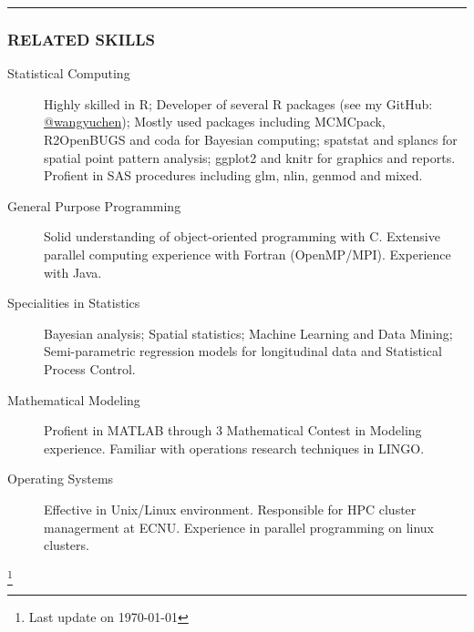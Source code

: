 \documentclass[11pt]{article}
\newcommand{\CPP}
{C\nolinebreak[4]\hspace{-.05em}\raisebox{.22ex}{\footnotesize\bf ++}}
\begin{document}
	\vspace{0.2em}
	\hrule

	\subsubsection*{\centering RELATED SKILLS}
	\vspace{-.3em}

	\begin{description}
		\item[Statistical Computing] Highly skilled in R; Developer of several R packages (see my GitHub: \href{https://www.github.com/wangyuchen}{@wangyuchen}); Mostly used packages including MCMCpack, R2OpenBUGS and coda for Bayesian computing; spatstat and splancs for spatial point pattern analysis; ggplot2 and knitr for graphics and reports. Profient in SAS procedures including glm, nlin, genmod and mixed.
		\item[General Purpose Programming] Solid understanding of object-oriented programming with \CPP. Extensive parallel computing experience with Fortran (OpenMP/MPI). Experience with Java.
		\item[Specialities in Statistics] Bayesian analysis; Spatial statistics; Machine Learning and Data Mining; Semi-parametric regression models for longitudinal data and Statistical Process Control.
		\item[Mathematical Modeling] Profient in MATLAB through 3 Mathematical Contest in Modeling experience. Familiar with operations research techniques in LINGO.
		\item[Operating Systems] Effective in Unix/Linux environment. Responsible for HPC cluster managerment at ECNU. Experience in parallel programming on linux clusters.
	\end{description}


\let\thefootnote\relax\footnote{Last update on \today}
\end{document}
